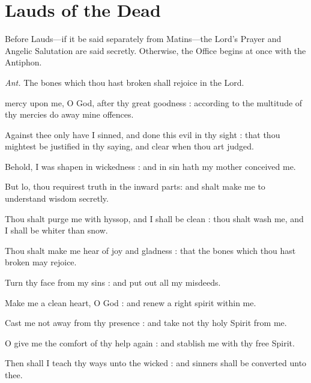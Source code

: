 \section{Lauds of the Dead}\label{laudsdead}
\begin{secrubric}
    Before Lauds---if it be said separately from Matins---the Lord's Prayer and Angelic Salutation are said secretly. Otherwise, the Office begins at once with the Antiphon.
\end{secrubric}
\par\noindent
\textit{Ant.} The bones which thou hast broken {\dag} shall rejoice in the Lord.\par
{} mercy upon me, O God, after thy great goodness : according to the multitude of thy mercies do away mine offences.\par
{}
Against thee only have I sinned, and done this evil in thy sight : that thou mightest be justified in thy saying, and clear when thou art judged.\par
{}Behold, I was shapen in wickedness : and in sin hath my mother conceived me.\par
{}But lo, thou requirest truth in the inward parts: and shalt make me to understand wisdom secretly.\par
{}Thou shalt purge me with hyssop, and I shall be clean : thou shalt wash me, and I shall be whiter than snow.\par
{}Thou shalt make me hear of joy and gladness : that the bones which thou hast broken may rejoice.\par
{}Turn thy face from my sins : and put out all my misdeeds.\par
{}Make me a clean heart, O God : and renew a right spirit within me.\par
{}Cast me not away from thy presence : and take not thy holy Spirit from me.\par
{}O give me the comfort of thy help again : and stablish me with thy free Spirit.\par
{}Then shall I teach thy ways unto the wicked : and sinners shall be converted unto thee.\par
